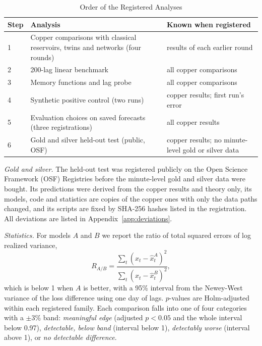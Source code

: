 \documentclass{ieeeaccess}
\begin{document}
\begin{table}[t]
\caption{Order of the Registered Analyses}
\label{tab:regs}
\centering
\begin{tabular}{p{0.35cm}p{3.3cm}p{3.5cm}}
\hline
Step & Analysis & Known when registered \\
\hline
1 & Copper comparisons with classical reservoirs, twins and networks (four rounds) & results of each earlier round \\
2 & 200-lag linear benchmark & all copper comparisons \\
3 & Memory functions and lag probe & all copper comparisons \\
4 & Synthetic positive control (two runs) & copper results; first run's error \\
5 & Evaluation choices on saved forecasts (three registrations) & all copper results \\
6 & Gold and silver held-out test (public, OSF) & copper results; no minute-level gold or silver data \\
\hline
\end{tabular}
\end{table}

\textit{Gold and silver.} The held-out test was registered publicly on the Open Science Framework (OSF) Registries \cite{osf2026} before the minute-level gold and silver data were bought. Its predictions were derived from the copper results and theory only, its models, code and statistics are copies of the copper ones with only the data paths changed, and its scripts are fixed by SHA-256 hashes listed in the registration. All deviations are listed in Appendix~\ref{app:deviations}.

\textit{Statistics.} For models $A$ and $B$ we report the ratio of total squared errors of log realized variance,
\begin{equation}
R_{A/B}=\frac{\sum_t (x_t-\hat{x}^A_t)^2}{\sum_t (x_t-\hat{x}^B_t)^2},
\label{eq:ratio}
\end{equation}
which is below 1 when $A$ is better, with a 95\% interval from the Newey-West variance \cite{newey1987} of the loss difference using one day of lags. $p$-values are Holm-adjusted \cite{holm1979} within each registered family. Each comparison falls into one of four categories with a $\pm3\%$ band: \emph{meaningful edge} (adjusted $p<0.05$ and the whole interval below 0.97), \emph{detectable, below band} (interval below 1), \emph{detectably worse} (interval above 1), or \emph{no detectable difference}.
\end{document}
